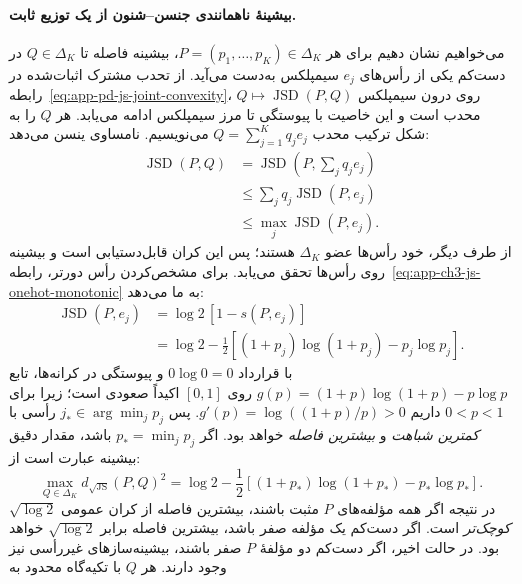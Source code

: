 \paragraph{بیشینهٔ ناهمانندی جنسن--شنون از یک توزیع ثابت.}
می‌خواهیم نشان دهیم برای هر
$P=(p_1,\ldots,p_K)\in\Delta_K$،
بیشینه فاصله تا $Q\in\Delta_K$
در دست‌کم یکی از رأس‌های $e_j$
سیمپلکس به‌دست می‌آید.
از تحدب مشترک اثبات‌شده در رابطه~\eqref{eq:app-pd-js-joint-convexity}،
$Q\mapsto\operatorname{JSD}(P,Q)$
روی درون سیمپلکس محدب است
و این خاصیت با پیوستگی
تا مرز سیمپلکس ادامه می‌یابد.
هر $Q$ را به شکل ترکیب محدب
$Q=\sum_{j=1}^{K}q_je_j$ می‌نویسیم.
نامساوی ینسن می‌دهد:
\begin{equation}\label{eq:app-ch3-js-farthest-vertex-convexity}
\begin{aligned}
\operatorname{JSD}(P,Q)
&=\operatorname{JSD}\!\left(
P,\sum_jq_je_j\right)\\
&\le\sum_jq_j\operatorname{JSD}(P,e_j)\\
&\le\max_j\operatorname{JSD}(P,e_j).
\end{aligned}
\end{equation}
از طرف دیگر، خود رأس‌ها
عضو $\Delta_K$ هستند؛
پس این کران قابل‌دستیابی است و
بیشینه روی رأس‌ها تحقق می‌یابد.
برای مشخص‌کردن رأس دورتر،
رابطه~\eqref{eq:app-ch3-js-onehot-monotonic}
به ما می‌دهد:
\begin{equation}\label{eq:app-ch3-js-farthest-vertex-formula}
\begin{aligned}
\operatorname{JSD}(P,e_j)
&=\log2\,[1-s(P,e_j)]\\
&=\log2-\frac12\left[
(1+p_j)\log(1+p_j)-p_j\log p_j
\right].
\end{aligned}
\end{equation}
با قرارداد $0\log0=0$ و
پیوستگی در کرانه‌ها، تابع
$g(p)=(1+p)\log(1+p)-p\log p$
روی $[0,1]$ اکیداً صعودی است؛
زیرا برای $0<p<1$ داریم
$g'(p)=\log((1+p)/p)>0$.
پس $j_*\in\arg\min_jp_j$
رأسی با \emph{کمترین شباهت}
و \emph{بیشترین فاصله} خواهد بود.
اگر $p_*=\min_jp_j$ باشد،
مقدار دقیق بیشینه عبارت است از:
\begin{equation}\label{eq:app-ch3-js-max-distance-value}
\boxed{
\max_{Q\in\Delta_K}d_{\sqrt{\mathrm{JS}}}(P,Q)^2
=\log2-\frac12\left[
(1+p_*)\log(1+p_*)-p_*\log p_*
\right].
}
\end{equation}
در نتیجه اگر همه مؤلفه‌های $P$
مثبت باشند، بیشترین فاصله
از کران عمومی $\sqrt{\log2}$
\emph{کوچک‌تر} است.
اگر دست‌کم یک مؤلفه صفر باشد،
بیشترین فاصله برابر
$\sqrt{\log2}$ خواهد بود.
در حالت اخیر، اگر دست‌کم دو مؤلفهٔ $P$ صفر باشند،
بیشینه‌سازهای غیررأسی نیز وجود دارند. هر $Q$ با تکیه‌گاه محدود به
